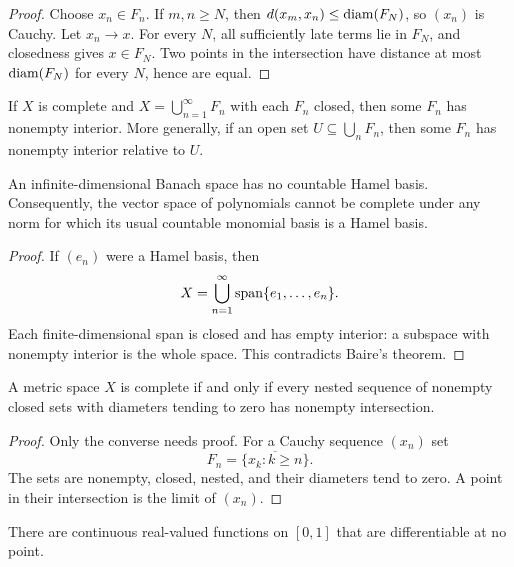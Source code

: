\begin{proof}
Choose $x_n\in F_n$.  If $m,n\ge N$, then
$d(x_m,x_n)\le\operatorname{diam}(F_N)$, so $(x_n)$ is Cauchy.  Let $x_n\to x$.  For every
$N$, all sufficiently late terms lie in $F_N$, and closedness gives
$x\in F_N$.  Two points in the intersection have distance at most
$\operatorname{diam}(F_N)$ for every $N$, hence are equal.
\end{proof}

\begin{notetheorem}
If $X$ is complete and $X=\bigcup_{n=1}^{\infty}F_n$ with each $F_n$ closed,
then some $F_n$ has nonempty interior.  More generally, if an open set
$U\subseteq\bigcup_nF_n$, then some $F_n$ has nonempty interior relative to
$U$.
\end{notetheorem}

\begin{notetheorem}
An infinite-dimensional Banach space has no countable Hamel basis.
Consequently, the vector space of polynomials cannot be complete under any
norm for which its usual countable monomial basis is a Hamel basis.
\end{notetheorem}

\begin{proof}
If $(e_n)$ were a Hamel basis, then
\[
  X=\bigcup_{n=1}^{\infty}\operatorname{span}\{e_1,\ldots,e_n\}.
\]
Each finite-dimensional span is closed and has empty interior: a subspace
with nonempty interior is the whole space.  This contradicts Baire's theorem.
\end{proof}

\begin{notetheorem}
A metric space $X$ is complete if and only if every nested sequence of
nonempty closed sets with diameters tending to zero has nonempty intersection.
\end{notetheorem}

\begin{proof}
Only the converse needs proof.  For a Cauchy sequence $(x_n)$ set
\[
  F_n=\overline{\{x_k:k\ge n\}}.
\]
The sets are nonempty, closed, nested, and their diameters tend to zero.
A point in their intersection is the limit of $(x_n)$.
\end{proof}

\begin{notetheorem}
There are continuous real-valued functions on $[0,1]$ that are differentiable
at no point.
\end{notetheorem}

